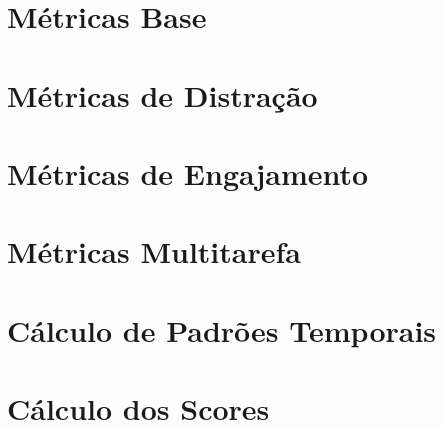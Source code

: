 \section{Métricas Base}\label{sub:espeon_base_metrics}


\section{Métricas de Distração}\label{sub:espeon_disturb_metrics}


\section{Métricas de Engajamento}\label{sub:espeon_engajement}


\section{Métricas Multitarefa}\label{sub:espeon_multitask}


\section{Cálculo de Padrões Temporais}\label{sub:espeon_tempo}


\section{Cálculo dos Scores}\label{sub:espeon_scores}


